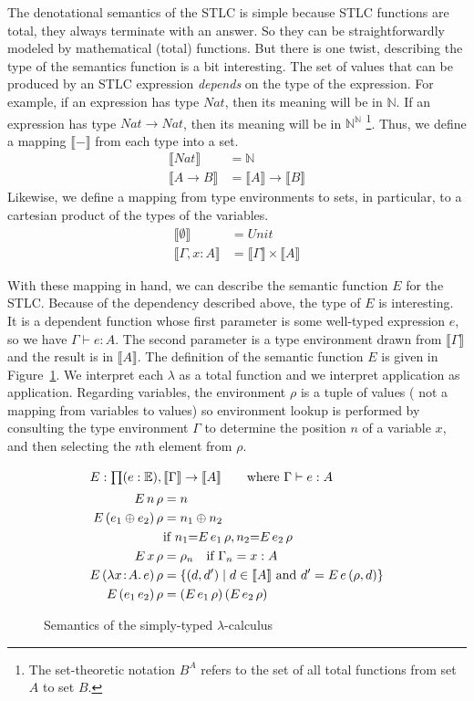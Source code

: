 \documentclass{tufte-handout}
\newcommand{\SEM}[1]{\llbracket #1 \rrbracket}
\newcommand{\LAM}[1]{\lambda #1.\,}
\newcommand{\APP}[0]{\,}
\newcommand{\of}[0]{\!:\!}
\newcommand{\NAT}[0]{\mathbb{N}}
\newcommand{\NATTY}[0]{\mathit{Nat}}
\newcommand{\UNITTY}[0]{\mathit{Unit}}
\newcommand{\EXP}[0]{\mathbb{E}}
\begin{document}
The denotational semantics of the STLC is simple because STLC
functions are total, they always terminate with an answer. So they can
be straightforwardly modeled by mathematical (total) functions. But
there is one twist, describing the type of the semantics function is a
bit interesting.  The set of values that can be produced by an STLC
expression \emph{depends} on the type of the expression. For example,
if an expression has type $\NATTY$, then its meaning will be in
$\NAT$. If an expression has type $\NATTY \to \NATTY$, then its
meaning will be in $\NAT^{\NAT}$
\footnote{The set-theoretic notation $B^A$ refers to the set of all
  total functions from set $A$ to set $B$.}.  Thus, we define a
mapping $\SEM{-}$ from each type into a set.
\begin{align*}
  \SEM{\NATTY} &= \mathbb{N} \\
  \SEM{A \to B} &= \SEM{A}\to \SEM{B}
\end{align*}
Likewise, we define a mapping from type environments to sets, in
particular, to a cartesian product of the types of the variables.
\begin{align*}
  \SEM{\emptyset} &= \UNITTY \\
  \SEM{\Gamma,x\of A} &= \SEM{\Gamma} \times \SEM{A}
\end{align*}

With these mapping in hand, we can describe the semantic function $E$
for the STLC. Because of the dependency described above, the type of
$E$ is interesting. It is a dependent function whose first parameter
is some well-typed expression $e$, so we have $\Gamma \vdash e : A$.
The second parameter is a type environment drawn from $\SEM{\Gamma}$
and the result is in $\SEM{A}$.  The definition of the semantic
function $E$ is given in Figure~\ref{fig:sem-stlc}.  We interpret each
$\lambda$ as a total function and we interpret application as
application. Regarding variables, the environment $\rho$ is a tuple of
values ( not a mapping from variables to values) so environment lookup
is performed by consulting the type environment $\Gamma$ to determine
the position $n$ of a variable $x$, and then selecting the $n$th
element from $\rho$.


\begin{figure}[tbp]
\begin{align*}
\intertext{$E : \prod (e : \EXP), \SEM{\Gamma} \to \SEM{A} \qquad \text{where } \Gamma \vdash e : A$}
  E\,n\,\rho &= n \\
  E\,(e_1\oplus e_2)\,\rho &= n_1 \oplus n_2 \\
     & \text{if } n_1 {=} E\,e_1\,\rho, n_2 {=} E\,e_2\,\rho \\
  E\,x\,\rho &= \rho_n \quad \text{if } \Gamma_n = x:A \\
  E\,(\LAM{x\of A}e)\,\rho &= \{ (d,d') \mid d \in \SEM{A} \text{ and } d' = E\,e\,(\rho,d) \} \\
  E\,(e_1 \APP e_2)\,\rho &= (E\,e_1\,\rho) \APP (E\,e_2\,\rho)
\end{align*}

\caption{Semantics of the simply-typed $\lambda$-calculus}
\label{fig:sem-stlc}
\end{figure}
\end{document}
